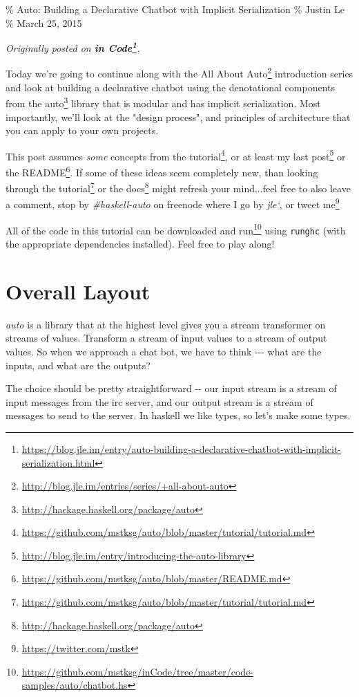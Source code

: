 \documentclass[]{article}
\renewcommand{\href}[2]{#2\footnote{\url{#1}}}
\begin{document}
\% Auto: Building a Declarative Chatbot with Implicit Serialization \% Justin Le
\% March 25, 2015

\emph{Originally posted on
\textbf{\href{https://blog.jle.im/entry/auto-building-a-declarative-chatbot-with-implicit-serialization.html}{in
Code}}.}

Today we're going to continue along with the
\href{http://blog.jle.im/entries/series/+all-about-auto}{All About Auto}
introduction series and look at building a declarative chatbot using the
denotational components from the
\href{http://hackage.haskell.org/package/auto}{auto} library that is modular and
has implicit serialization. Most importantly, we'll look at the "design
process", and principles of architecture that you can apply to your own
projects.

This post assumes \emph{some} concepts from the
\href{https://github.com/mstksg/auto/blob/master/tutorial/tutorial.md}{tutorial},
or at least my \href{http://blog.jle.im/entry/introducing-the-auto-library}{last
post} or the
\href{https://github.com/mstksg/auto/blob/master/README.md}{README}. If some of
these ideas seem completely new, than looking through the
\href{https://github.com/mstksg/auto/blob/master/tutorial/tutorial.md}{tutorial}
or the \href{http://hackage.haskell.org/package/auto}{docs} might refresh your
mind...feel free to also leave a comment, stop by \emph{\#haskell-auto} on
freenode where I go by \emph{jle`}, or \href{https://twitter.com/mstk}{tweet me}

All of the code in this tutorial can be
\href{https://github.com/mstksg/inCode/tree/master/code-samples/auto/chatbot.hs}{downloaded
and run} using \texttt{runghc} (with the appropriate dependencies installed).
Feel free to play along!

\section{Overall Layout}

\emph{auto} is a library that at the highest level gives you a stream
transformer on streams of values. Transform a stream of input values to a stream
of output values. So when we approach a chat bot, we have to think -\/-\/- what
are the inputs, and what are the outputs?

The choice should be pretty straightforward -\/- our input stream is a stream of
input messages from the irc server, and our output stream is a stream of
messages to send to the server. In haskell we like types, so let's make some
types.
\end{document}
